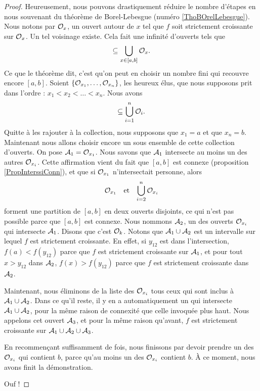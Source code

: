 \begin{proof}
	Heureusement, nous pouvons drastiquement réduire le nombre d'étapes en nous souvenant du théorème de Borel-Lebesgue (numéro \ref{ThoBOrelLebesgue}). Nous notons par $\mathcal{O}_x$, un ouvert autour de $x$ tel que $f$ soit strictement croissante sur $\mathcal{O}_x$. Un tel voisinage existe. Cela fait une infinité d'ouverts tels que
	\begin{equation}
		[a,b]\subseteq\bigcup_{x\in[a,b]}\mO_x.
	\end{equation}
	Ce que le théorème dit, c'est qu'on peut en choisir un nombre fini qui recouvre encore $[a,b]$. Soient $\{ \mathcal{O}_{x_1},\ldots,\mathcal{O}_{x_n} \}$, les heureux élus, que nous supposons prit dans l'ordre : $x_1<x_2<\ldots<x_n$. Nous avons
	\begin{equation}
		[a,b]\subseteq\bigcup_{i=1}^n\mO_i.
	\end{equation}
	Quitte à les rajouter à la collection, nous supposons que $x_1=a$ et que $x_n=b$. Maintenant nous allons choisir encore un sous ensemble de cette collection d'ouverts. On pose $\mathcal{A}_1=\mathcal{O}_{x_1}$. Nous savons que $\mathcal{A}_1$ intersecte au moins un des autres $\mathcal{O}_{x_i}$. Cette affirmation vient du fait que $[a,b]$ est connexe (proposition \ref{PropInterssiConn}), et que si $\mathcal{O}_{x_1}$ n'intersectait personne, alors 
	\begin{equation}
		\begin{aligned}[]
			\mO_{x_1}&&\text{et}&&\bigcup_{i=2}^n\mO_{x_i}
		\end{aligned}
	\end{equation}
	forment une partition de $[a,b]$ en deux ouverts disjoints, ce qui n'est pas possible parce que $[a,b]$ est connexe. Nous nommons $\mathcal{A}_2$, un des ouverts $\mathcal{O}_{x_i}$ qui intersecte $\mathcal{A}_1$. Disons que c'est $\mathcal{O}_k$. Notons que $\mathcal{A}_1\cup\mathcal{A}_2$ est un intervalle sur lequel $f$ est strictement croissante. En effet, si $y_{12}$ est dans l'intersection, $f(a)<f(y_{12})$ parce que $f$ est strictement croissante sur $\mathcal{A}_1$, et pour tout $x>y_{12}$ dans $\mathcal{A}_2$, $f(x)>f(y_{12})$ parce que $f$ est strictement croissante dans $\mathcal{A}_2$. 

	Maintenant, nous éliminons de la liste des $\mathcal{O}_{x_i}$ tous ceux qui sont inclus à $\mathcal{A}_1\cup\mathcal{A}_2$. Dans ce qu'il reste, il y en a automatiquement un qui intersecte $\mathcal{A}_1\cup\mathcal{A}_2$, pour la même raison de connexité que celle invoquée plus haut. Nous appelons cet ouvert $\mathcal{A}_3$, et pour la même raison qu'avant, $f$ est strictement croissante sur $\mathcal{A}_1\cup\mathcal{A}_2\cup\mathcal{A}_3$.

	En recommençant suffisamment de fois, nous finissons par devoir prendre un des $\mathcal{O}_{x_i}$ qui contient $b$, parce qu'au moins un des $\mathcal{O}_{x_i}$ contient $b$. À ce moment, nous avons finit la démonstration.

	Ouf !
\end{proof}

